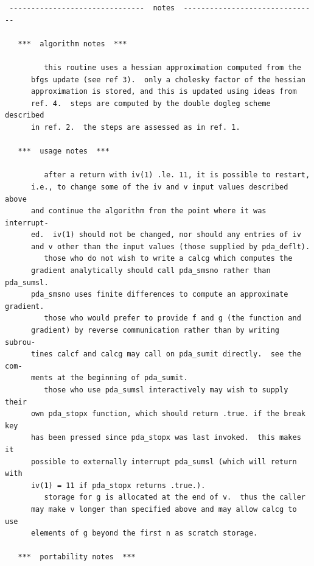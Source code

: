 \documentclass[11pt,twoside]{article}
\begin{document}
\begin{verbatim}
 -------------------------------  notes  -------------------------------
 
   ***  algorithm notes  ***
 
         this routine uses a hessian approximation computed from the
      bfgs update (see ref 3).  only a cholesky factor of the hessian
      approximation is stored, and this is updated using ideas from
      ref. 4.  steps are computed by the double dogleg scheme described
      in ref. 2.  the steps are assessed as in ref. 1.
 
   ***  usage notes  ***
 
         after a return with iv(1) .le. 11, it is possible to restart,
      i.e., to change some of the iv and v input values described above
      and continue the algorithm from the point where it was interrupt-
      ed.  iv(1) should not be changed, nor should any entries of iv
      and v other than the input values (those supplied by pda_deflt).
         those who do not wish to write a calcg which computes the
      gradient analytically should call pda_smsno rather than pda_sumsl.
      pda_smsno uses finite differences to compute an approximate gradient.
         those who would prefer to provide f and g (the function and
      gradient) by reverse communication rather than by writing subrou-
      tines calcf and calcg may call on pda_sumit directly.  see the com-
      ments at the beginning of pda_sumit.
         those who use pda_sumsl interactively may wish to supply their
      own pda_stopx function, which should return .true. if the break key
      has been pressed since pda_stopx was last invoked.  this makes it
      possible to externally interrupt pda_sumsl (which will return with
      iv(1) = 11 if pda_stopx returns .true.).
         storage for g is allocated at the end of v.  thus the caller
      may make v longer than specified above and may allow calcg to use
      elements of g beyond the first n as scratch storage.
 
   ***  portability notes  ***
 

\end{verbatim}
\end{document}
